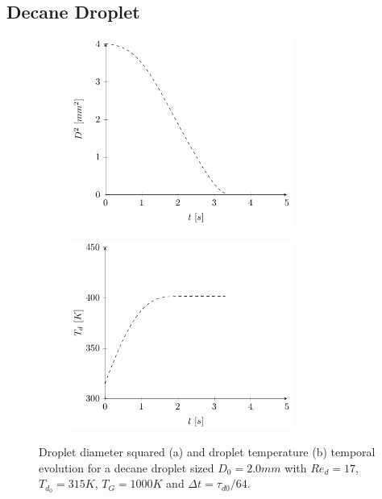 \documentclass[../Interim_Report_Master]{subfiles}
\begin{document}
\subsection{Decane Droplet}
\begin{figure}[H]
	\centering
	\begin{subfigure}{\textwidth}
		\centering
		\includegraphics[width=0.8\textwidth]{./Diagrams/OpenCL_Coupled_Heat_Mass_Transfer_Verification/Coupled_D2_Transfer_Decane.pdf}
		\caption{}
		\label{coupled_d2_decane}
	\end{subfigure}
\end{figure}
\begin{figure}\ContinuedFloat
	\begin{subfigure}{\textwidth}
		\centering
		\includegraphics[width=0.8\textwidth]{./Diagrams/OpenCL_Coupled_Heat_Mass_Transfer_Verification/Coupled_Heat_Transfer_Decane.pdf}
		\caption{}
		\label{coupled_heat_decane}
	\end{subfigure}
	\caption{Droplet diameter squared (a) and droplet temperature (b) temporal evolution for a decane droplet sized $D_0=2.0mm$ with $Re_d=17$, $T_{d_0}=315K$, $T_G=1000K$ and $\Delta t=\tau_{d0}/64$.}
\end{figure}
\end{document}
